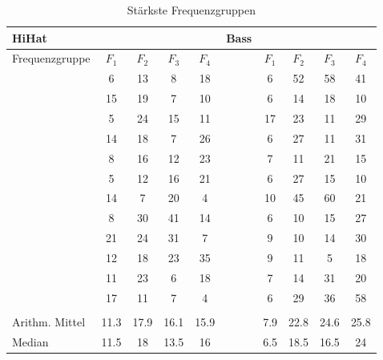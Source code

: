 \begin{table}[H]
	\centering
	\caption{Stärkste Frequenzgruppen}
	\begin{tabular}{l c c c c | l c c c c}
		HiHat &&&& &Bass \\
		\hline
		Frequenzgruppe & $F_1$ & $F_2$ & $F_3$ & $F_4$  & & $F_1$ & $F_2$ & $F_3$ & $F_4$\\	
		
        & 6	 & 13  & 8  & 18 && 6  & 52 &	58 & 41\\
        & 15 &	19 & 7  & 10 && 6  & 14 &	18 & 10\\
        & 5  &	24 & 15	& 11 && 17 & 23 &	11 & 29\\
        & 14 &	18 & 7  & 26 && 6  & 27 &	11 & 31\\
        & 8	 &  16 & 12 & 23 && 7  & 11 &	21 & 15\\
        & 5  &	12 & 16 & 21 && 6  & 27 &	15 & 10\\
        & 14 &	7  & 20	& 4  && 10 & 45 &	60 & 21\\
        & 8	 &  30 & 41 & 14 &&  6 & 10 &	15 & 27\\
        & 21 &	24 & 31 & 7  &&  9 & 10 &	14 & 30\\
        & 12 &	18 & 23 & 35 &&  9 & 11 &	5  & 18\\
        & 11 &	23 &  6 & 18 &&  7 & 14 &	31 & 20\\
        & 17 &	11 &  7 &  4 &&  6 & 29 &	36 & 58\\
        		\\
		\hline
		Arithm. Mittel & 11.3 & 17.9 & 16.1 &	15.9  && 7.9 & 22.8 &	24.6 &	25.8\\
		Median       & 11.5 & 18   & 13.5 &	16    && 6.5 & 18.5 &	16.5 &	24\\		 

 
        
%
%
%
%
%
%
		

	\end{tabular}
	\label{tab:FFT}
\end{table}

